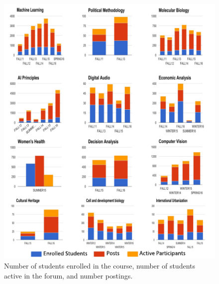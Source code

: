  \begin{figure}[htp]
       \centering
       \includegraphics{Figs/classesInDatasetLegendAltered.pdf}
       \caption{\textnormal{Number of students enrolled in the course,
           number of students active in the forum, and number
           postings.}}
       \label{fig:simpleCrsStats}
\end{figure}
 
